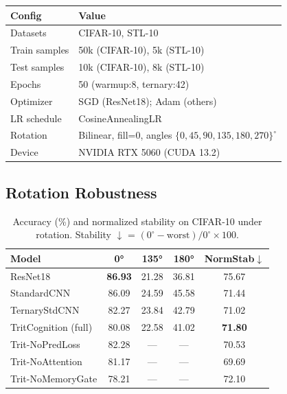 \documentclass[10pt,twocolumn]{article}
\newcommand{\tritnet}{TritCognition}
\begin{document}
\begin{table}[h]
\centering\small
\begin{tabular}{ll}
\toprule
Config & Value \\ \midrule
Datasets      & CIFAR-10, STL-10 \\
Train samples & 50k (CIFAR-10), 5k (STL-10) \\
Test samples  & 10k (CIFAR-10), 8k (STL-10) \\
Epochs        & 50 (warmup:8, ternary:42) \\
Optimizer     & SGD (ResNet18); Adam (others) \\
LR schedule   & CosineAnnealingLR \\
Rotation      & Bilinear, fill=0, angles $\{0,45,90,135,180,270\}^\circ$ \\
Device        & NVIDIA RTX 5060 (CUDA 13.2) \\
\bottomrule
\end{tabular}
\end{table}

\subsection{Rotation Robustness}

\begin{table}[H]
\centering\small
\caption{Accuracy (\%) and normalized stability on CIFAR-10 under rotation.
Stability $\downarrow$ = $(0^\circ - \text{worst}) / 0^\circ \times 100$.}
\begin{tabular}{lcccc}
\toprule
Model & 0° & 135° & 180° & NormStab$\downarrow$ \\ \midrule
ResNet18          & \textbf{86.93} & 21.28 & 36.81 & 75.67 \\
StandardCNN       & 86.09 & 24.59 & 45.58 & 71.44 \\
TernaryStdCNN     & 82.27 & 23.84 & 42.79 & 71.02 \\
\tritnet{} (full) & 80.08 & 22.58 & 41.02 & \textbf{71.80} \\
Trit-NoPredLoss   & 82.28 & ---   & ---   & 70.53 \\
Trit-NoAttention  & 81.17 & ---   & ---   & 69.69 \\
Trit-NoMemoryGate & 78.21 & ---   & ---   & 72.10 \\
\bottomrule
\end{tabular}
\end{table}
\end{document}
